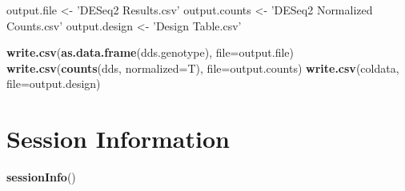 \documentclass[]{article}
\newenvironment{Shaded}{\begin{snugshade}}{\end{snugshade}}
\newcommand{\DataTypeTok}[1]{\textcolor[rgb]{0.13,0.29,0.53}{#1}}
\newcommand{\KeywordTok}[1]{\textcolor[rgb]{0.13,0.29,0.53}{\textbf{#1}}}
\newcommand{\NormalTok}[1]{#1}
\newcommand{\StringTok}[1]{\textcolor[rgb]{0.31,0.60,0.02}{#1}}
\begin{document}
\begin{Shaded}
\begin{Highlighting}[]
\NormalTok{output.file <-}\StringTok{ 'DESeq2 Results.csv'}
\NormalTok{output.counts <-}\StringTok{ 'DESeq2 Normalized Counts.csv'}
\NormalTok{output.design <-}\StringTok{ 'Design Table.csv'}

\KeywordTok{write.csv}\NormalTok{(}\KeywordTok{as.data.frame}\NormalTok{(dds.genotype), }\DataTypeTok{file=}\NormalTok{output.file)}
\KeywordTok{write.csv}\NormalTok{(}\KeywordTok{counts}\NormalTok{(dds, }\DataTypeTok{normalized=}\NormalTok{T), }\DataTypeTok{file=}\NormalTok{output.counts)}
\KeywordTok{write.csv}\NormalTok{(coldata, }\DataTypeTok{file=}\NormalTok{output.design)}
\end{Highlighting}
\end{Shaded}

\hypertarget{session-information}{%
\section{Session Information}\label{session-information}}

\begin{Shaded}
\begin{Highlighting}[]
\KeywordTok{sessionInfo}\NormalTok{()}
\end{Highlighting}
\end{Shaded}
\end{document}
